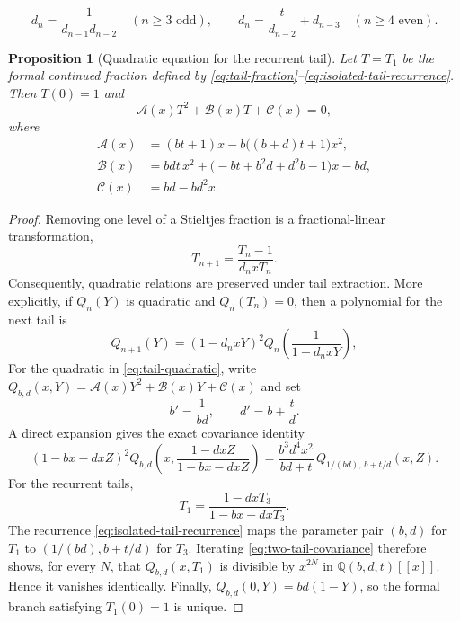 \documentclass[10pt,a4paper]{amsart}
\newtheorem{proposition}{Proposition}
\begin{document}
\begin{equation}
 d_n=\frac1{d_{n-1}d_{n-2}}\quad(n\geq3\text{ odd}),\qquad
 d_n=\frac{t}{d_{n-2}}+d_{n-3}\quad(n\geq4\text{ even}).
 \label{eq:isolated-tail-recurrence}
\end{equation}

\begin{proposition}[Quadratic equation for the recurrent tail]
\label{prop:tail-quadratic}
Let $T=T_1$ be the formal continued fraction defined by
\eqref{eq:tail-fraction}--\eqref{eq:isolated-tail-recurrence}. Then $T(0)=1$ and
\begin{equation}
 \mathcal A(x)T^2+\mathcal B(x)T+\mathcal C(x)=0,
 \label{eq:tail-quadratic}
\end{equation}
where
\begin{align}
 \mathcal A(x)&=(bt+1)x-b\bigl((b+d)t+1\bigr)x^2,
 \label{eq:tail-A}\\
 \mathcal B(x)&=bdt\,x^2+\bigl(-bt+b^2d+d^2b-1\bigr)x-bd,
 \label{eq:tail-B}\\
 \mathcal C(x)&=bd-bd^2x.
 \label{eq:tail-C}
\end{align}
\end{proposition}

\begin{proof}
Removing one level of a Stieltjes fraction is a fractional-linear
transformation,
\begin{equation}
 T_{n+1}=\frac{T_n-1}{d_nxT_n}.
 \label{eq:tail-extraction}
\end{equation}
Consequently, quadratic relations are preserved under tail extraction. More
explicitly, if $Q_n(Y)$ is quadratic and $Q_n(T_n)=0$, then a polynomial for
the next tail is
\begin{equation}
 Q_{n+1}(Y)=(1-d_nxY)^2
 Q_n\!\left(\frac1{1-d_nxY}\right),
 \label{eq:quadratic-transport}
\end{equation}
For the quadratic in \eqref{eq:tail-quadratic}, write
$Q_{b,d}(x,Y)=\mathcal A(x)Y^2+\mathcal B(x)Y+\mathcal C(x)$ and set
\[
 b'=\frac1{bd},\qquad d'=b+\frac{t}{d}.
\]
A direct expansion gives the exact covariance identity
\begin{equation}
 (1-bx-dxZ)^2Q_{b,d}\!\left(x,\frac{1-dxZ}{1-bx-dxZ}\right)
 =\frac{b^3d^4x^2}{bd+t}\,Q_{1/(bd),\,b+t/d}(x,Z).
 \label{eq:two-tail-covariance}
\end{equation}
For the recurrent tails,
\[
 T_1=\frac{1-dxT_3}{1-bx-dxT_3}.
\]
The recurrence \eqref{eq:isolated-tail-recurrence} maps the parameter pair
$(b,d)$ for $T_1$ to $(1/(bd),b+t/d)$ for $T_3$.  Iterating
\eqref{eq:two-tail-covariance} therefore shows, for every $N$, that
$Q_{b,d}(x,T_1)$ is divisible by $x^{2N}$ in
$\mathbb Q(b,d,t)[[x]]$.  Hence it vanishes identically.  Finally,
$Q_{b,d}(0,Y)=bd(1-Y)$, so the formal branch satisfying $T_1(0)=1$ is unique.
\end{proof}
\end{document}
